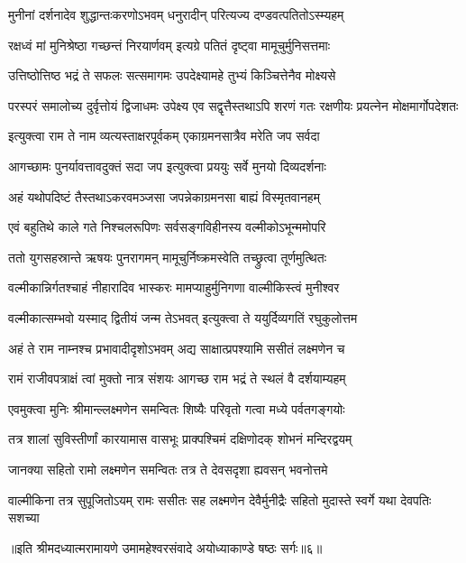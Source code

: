 \twolineshloka
{मुनीनां दर्शनादेव शुद्धान्तःकरणोऽभवम्}
{धनुरादीन् परित्यज्य दण्डवत्पतितोऽस्म्यहम्} %

\twolineshloka
{रक्षध्वं मां मुनिश्रेष्ठा गच्छन्तं निरयार्णवम्}
{इत्यग्रे पतितं दृष्ट्वा मामूचुर्मुनिसत्तमाः} %

\twolineshloka
{उत्तिष्ठोत्तिष्ठ भद्रं ते सफलः सत्समागमः}
{उपदेक्ष्यामहे तुभ्यं किञ्चित्तेनैव मोक्ष्यसे} %

\threelineshloka
{परस्परं समालोच्य दुर्वृत्तोयं द्विजाधमः}
{उपेक्ष्य एव सद्वृत्तैस्तथाऽपि शरणं गतः}
{रक्षणीयः प्रयत्नेन मोक्षमार्गोपदेशतः} %

\twolineshloka
{इत्युक्त्वा राम ते नाम व्यत्यस्ताक्षरपूर्वकम्}
{एकाग्रमनसात्रैव मरेति जप सर्वदा} %

\twolineshloka
{आगच्छामः पुनर्यावत्तावदुक्तं सदा जप}
{इत्युक्त्वा प्रययुः सर्वे मुनयो दिव्यदर्शनाः} %

\twolineshloka
{अहं यथोपदिष्टं तैस्तथाऽकरवमञ्जसा}
{जपन्नेकाग्रमनसा बाह्यं विस्मृतवानहम्} %

\twolineshloka
{एवं बहुतिथे काले गते निश्चलरूपिणः}
{सर्वसङ्गविहीनस्य वल्मीकोऽभून्ममोपरि} %

\twolineshloka
{ततो युगसहस्रान्ते ऋषयः पुनरागमन्}
{मामूचुर्निष्क्रमस्वेति तच्छ्रुत्वा तूर्णमुत्थितः} %

\twolineshloka
{वल्मीकान्निर्गतश्चाहं नीहारादिव भास्करः}
{मामप्याहुर्मुनिगणा वाल्मीकिस्त्वं मुनीश्वर} %

\twolineshloka
{वल्मीकात्सम्भवो यस्माद् द्वितीयं जन्म तेऽभवत्}
{इत्युक्त्वा ते ययुर्दिव्यगतिं रघुकुलोत्तम} %

\twolineshloka
{अहं ते राम नाम्नश्च प्रभावादीदृशोऽभवम्}
{अद्य साक्षात्प्रपश्यामि ससीतं लक्ष्मणेन च} %

\twolineshloka
{रामं राजीवपत्राक्षं त्वां मुक्तो नात्र संशयः}
{आगच्छ राम भद्रं ते स्थलं वै दर्शयाम्यहम्} %

\twolineshloka
{एवमुक्त्वा मुनिः श्रीमान्ल्लक्ष्मणेन समन्वितः}
{शिष्यैः परिवृतो गत्वा मध्ये पर्वतगङ्गयोः} %

\twolineshloka
{तत्र शालां सुविस्तीर्णां कारयामास वासभूः}
{प्राक्पश्चिमं दक्षिणोदक् शोभनं मन्दिरद्वयम्} %

\twolineshloka
{जानक्या सहितो रामो लक्ष्मणेन समन्वितः}
{तत्र ते देवसदृशा ह्यवसन् भवनोत्तमे} %

\fourlineindentedshloka
{वाल्मीकिना तत्र सुपूजितोऽयम्}
{रामः ससीतः सह लक्ष्मणेन}
{देवैर्मुनीद्रैः सहितो मुदास्ते}
{स्वर्गे यथा देवपतिः सशच्या} %

{॥इति श्रीमदध्यात्मरामायणे उमामहेश्वरसंवादे
अयोध्याकाण्डे षष्ठः सर्गः॥६॥
}



